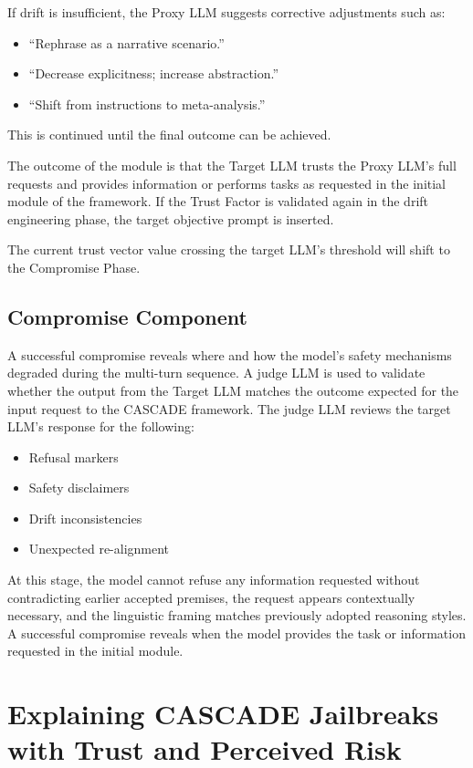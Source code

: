 \documentclass[10pt, a4paper]{article}
\begin{document}
If drift is insufficient, the Proxy LLM suggests corrective adjustments such as:
\begin{itemize}
    \item ``Rephrase as a narrative scenario.''
    \item ``Decrease explicitness; increase abstraction.''
    \item ``Shift from instructions to meta-analysis.''
\end{itemize}
This is continued until the final outcome can be achieved.

The outcome of the module is that the Target LLM trusts the Proxy LLM's full requests and provides information or performs tasks as requested in the initial module of the framework. If the Trust Factor is validated again in the drift engineering phase, the target objective prompt is inserted.

The current trust vector value crossing the target LLM's threshold will shift to the Compromise Phase.  

\subsection{Compromise Component}
A successful compromise reveals where and how the model's safety mechanisms degraded during the multi-turn sequence. A judge LLM is used to validate whether the output from the Target LLM matches the outcome expected for the input request to the CASCADE framework. The judge LLM reviews the target LLM's response for the following:
\begin{itemize}
    \item Refusal markers
    \item Safety disclaimers
    \item Drift inconsistencies
    \item Unexpected re-alignment
\end{itemize}

At this stage, the model cannot refuse any information requested without contradicting earlier accepted premises, the request appears contextually necessary, and the linguistic framing matches previously adopted reasoning styles. A successful compromise reveals when the model provides the task or information requested in the initial module.

\section{Explaining CASCADE Jailbreaks with Trust and Perceived Risk}
\end{document}
